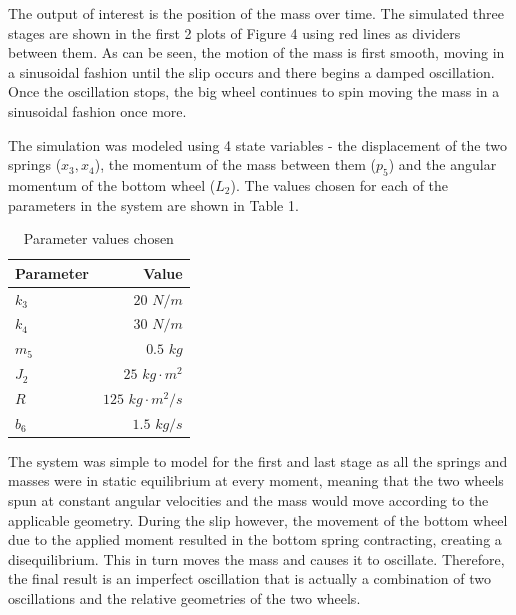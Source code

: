 \documentclass[twoside,twocolumn]{article}
\begin{document}
The output of interest is the position of the mass over time. The simulated three stages are shown in the first 2 plots of Figure 4 using red lines as dividers between them. As can be seen, the motion of the mass is first smooth, moving in a sinusoidal fashion until the slip occurs and there begins a damped oscillation. Once the oscillation stops, the big wheel continues to spin moving the mass in a sinusoidal fashion once more.

The simulation was modeled using 4 state variables - the displacement of the two springs ($x_3, x_4$), the momentum of the mass between them ($p_5$) and the angular momentum of the bottom wheel ($L_2$). The values chosen for each of the parameters in the system are shown in Table 1.

\begin{table}
\caption{Parameter values chosen}
\centering
\begin{tabular}{lr}
\toprule
\cmidrule(r){1-2}
Parameter & Value \\
\midrule
$k_3$ & $20$ $N/m$ \\
$k_4$ & $30$ $N/m$ \\
$m_5$ & $0.5$ $kg$ \\
$J_2$ & $25$ $kg \cdot m^2$ \\
$R$ & $125$ $kg \cdot m^2/s$ \\
$b_6$ & $1.5$ $kg/s$ \\
\bottomrule
\end{tabular}
\end{table}

The system was simple to model for the first and last stage as all the springs and masses were in static equilibrium at every moment, meaning that the two wheels spun at constant angular velocities and the mass would move according to the applicable geometry. During the slip however, the movement of the bottom wheel due to the applied moment resulted in the bottom spring contracting, creating a disequilibrium. This in turn moves the mass and causes it to oscillate. Therefore, the final result is an imperfect oscillation that is actually a combination of two oscillations and the relative geometries of the two wheels.


\end{document}
